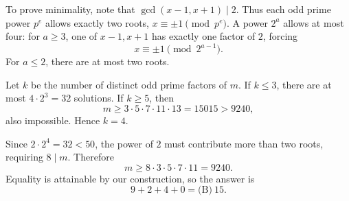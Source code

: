 \begin{enumerate}
 To prove minimality, note that $\gcd(x-1,x+1)\mid2$. Thus each odd prime power $p^e$ allows exactly two roots, $x\equiv\pm1\pmod{p^e}$. A power $2^a$ allows at most four: for $a\ge3$, one of $x-1,x+1$ has exactly one factor of $2$, forcing
 \[x\equiv\pm1\pmod{2^{a-1}}.\]For $a\le2$, there are at most two roots.

 Let $k$ be the number of distinct odd prime factors of $m$. If $k\le3$, there are at most $4\cdot2^3=32$ solutions. If $k\ge5$, then
 \[m\ge3\cdot5\cdot7\cdot11\cdot13=15015>9240,\]also impossible. Hence $k=4$.

 Since $2\cdot2^4=32<50$, the power of $2$ must contribute more than two roots, requiring $8\mid m$. Therefore
 \[m\ge8\cdot3\cdot5\cdot7\cdot11=9240.\]Equality is attainable by our construction, so the answer is
 \[9+2+4+0=\boxed{\text{(B)}\ 15}.\]



\end{enumerate}